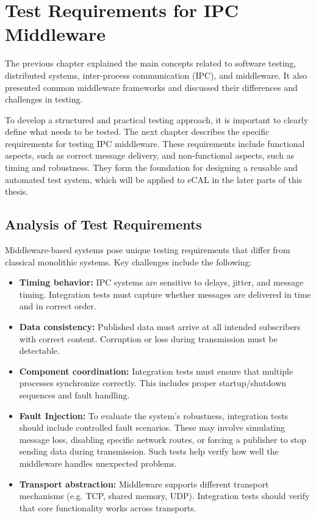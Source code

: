 \clearpage
{}

\section{Test Requirements for IPC Middleware}

The previous chapter explained the main concepts related to software testing, distributed systems, inter-process communication (IPC), and middleware. It also presented common middleware frameworks and discussed their differences and challenges in testing.

\vspace{1em}
To develop a structured and practical testing approach, it is important to clearly define what needs to be tested. The next chapter describes the specific requirements for testing IPC middleware. These requirements include functional aspects, such as correct message delivery, and non-functional aspects, such as timing and robustness. They form the foundation for designing a reusable and automated test system, which will be applied to eCAL in the later parts of this thesis.

\subsection{Analysis of Test Requirements}

Middleware-based systems pose unique testing requirements that differ from classical monolithic systems. Key challenges include the following:

\begin{itemize}
	\item \textbf{Timing behavior:} IPC systems are sensitive to delays, jitter, and message timing. Integration tests must capture whether messages are delivered in time and in correct order.
	
	\item \textbf{Data consistency:} Published data must arrive at all intended subscribers with correct content. Corruption or loss during transmission must be detectable.
	
	\item \textbf{Component coordination:} Integration tests must ensure that multiple processes synchronize correctly. This includes proper startup/shutdown sequences and fault handling.
	
	\item \textbf{Fault Injection:} To evaluate the system’s robustness, integration tests should include controlled fault scenarios. These may involve simulating message loss, disabling specific network routes, or forcing a publisher to stop sending data during transmission. Such tests help verify how well the middleware handles unexpected problems.
	\item \textbf{Transport abstraction:} Middleware supports different transport mechanisms (e.g. TCP, shared memory, UDP). Integration tests should verify that core functionality works across transports.
\end{itemize}

